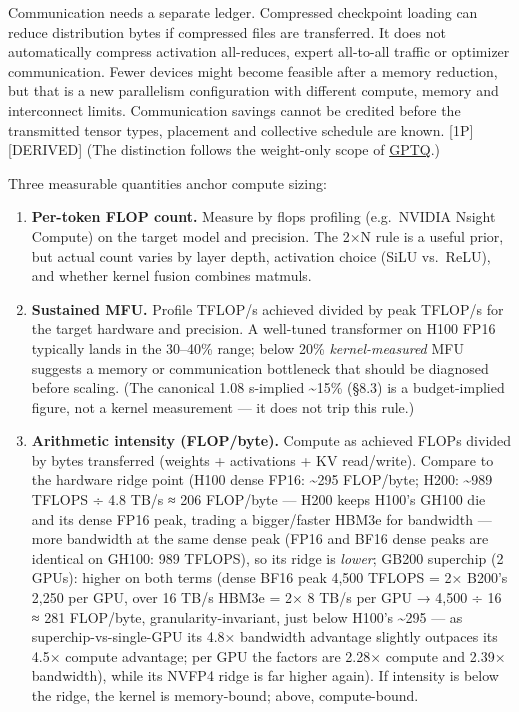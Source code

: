 Communication needs a separate ledger. Compressed checkpoint loading can
reduce distribution bytes if compressed files are transferred. It does
not automatically compress activation all-reduces, expert all-to-all
traffic or optimizer communication. Fewer devices might become feasible
after a memory reduction, but that is a new parallelism configuration
with different compute, memory and interconnect limits. Communication
savings cannot be credited before the transmitted tensor types,
placement and collective schedule are known. \mbox{{[}1P{]}}\hspace{0pt}\mbox{{[}DERIVED{]}} (The
distinction follows the weight-only scope of
\href{https://arxiv.org/pdf/2210.17323v2}{GPTQ}.)

\label{measurement}


Three measurable quantities anchor compute sizing:

\begin{enumerate}
\def\labelenumi{\arabic{enumi}.}
\item
  \textbf{Per-token FLOP count.} Measure by flops profiling (e.g.~NVIDIA
  Nsight Compute) on the target model and precision. The 2×N rule is a
  useful prior, but actual count varies by layer depth, activation
  choice (SiLU vs.~ReLU), and whether kernel fusion combines matmuls.
\item
  \textbf{Sustained MFU.} Profile TFLOP/s achieved divided by peak
  TFLOP/s for the target hardware and precision. A well-tuned
  transformer on H100 FP16 typically lands in the 30--40\% range; below
  20\% \emph{kernel-measured} MFU suggests a memory or communication
  bottleneck that should be diagnosed before scaling. (The canonical
  1.08 s-implied \textasciitilde15\% (§8.3) is a budget-implied figure,
  not a kernel measurement --- it does not trip this rule.)
\item
  \textbf{Arithmetic intensity (FLOP/byte).} Compute as achieved FLOPs
  divided by bytes transferred (weights + activations + KV read/write).
  Compare to the hardware ridge point (H100 dense FP16:
  \textasciitilde295 FLOP/byte; H200: \textasciitilde989 TFLOPS ÷ 4.8
  TB/s ≈ 206 FLOP/byte --- H200 keeps H100's GH100 die and its dense
  FP16 peak, trading a bigger/faster HBM3e for bandwidth --- more
  bandwidth at the same dense peak (FP16 and BF16 dense peaks are
  identical on GH100: 989 TFLOPS), so its ridge is \emph{lower}; GB200
  superchip (2 GPUs): higher on both terms (dense BF16 peak 4,500 TFLOPS
  = 2× B200's 2,250 per GPU, over 16 TB/s HBM3e = 2× 8 TB/s per GPU →
  4,500 ÷ 16 ≈ 281 FLOP/byte, granularity-invariant, just below H100's
  \textasciitilde295 --- as superchip-vs-single-GPU its 4.8× bandwidth
  advantage slightly outpaces its 4.5× compute advantage; per GPU the
  factors are 2.28× compute and 2.39× bandwidth), while its NVFP4 ridge
  is far higher again). If intensity is below the ridge, the kernel is
  memory-bound; above, compute-bound.
\end{enumerate}

